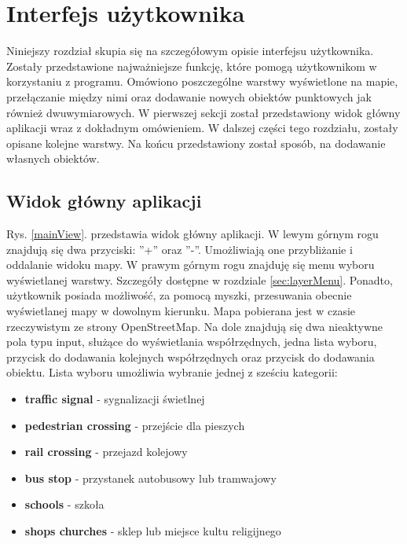 \chapter{Interfejs użytkownika}
\label{cha:UI}
Niniejszy rozdział skupia się na szczegółowym opisie interfejsu użytkownika. Zostały przedstawione najważniejsze funkcję, które pomogą użytkownikom w korzystaniu z programu. Omówiono poszczególne warstwy wyświetlone na mapie, przełączanie między nimi oraz dodawanie nowych obiektów punktowych jak również dwuwymiarowych.
W pierwszej sekcji został przedstawiony widok główny aplikacji wraz z dokładnym omówieniem. W dalszej części tego rozdziału, zostały opisane kolejne warstwy. Na końcu przedstawiony został sposób, na dodawanie własnych obiektów.
\section{Widok główny aplikacji}
\label{sec:mainView}

Rys. \ref{mainView}. przedstawia widok główny aplikacji. W lewym górnym rogu znajdują się dwa przyciski: ''+'' oraz ''-''. Umożliwiają one przybliżanie i oddalanie widoku mapy. W prawym górnym rogu znajduję się menu wyboru wyświetlanej warstwy. Szczegóły dostępne w rozdziale \ref{sec:layerMenu}. Ponadto, użytkownik posiada możliwość, za pomocą myszki, przesuwania obecnie wyświetlanej mapy w dowolnym kierunku. Mapa pobierana jest w czasie rzeczywistym ze strony OpenStreetMap. Na dole znajdują się dwa nieaktywne pola typu input, służące do wyświetlania współrzędnych, jedna lista wyboru, przycisk do dodawania kolejnych współrzędnych oraz przycisk do dodawania obiektu. Lista wyboru umożliwia wybranie jednej z sześciu kategorii:
\begin{itemize}
\item \textbf{traffic signal} - sygnalizacji świetlnej
\item \textbf{pedestrian crossing} - przejście dla pieszych
\item \textbf{rail crossing} - przejazd kolejowy
\item \textbf{bus stop} - przystanek autobusowy lub tramwajowy
\item \textbf{schools} - szkoła
\item \textbf{shops churches} - sklep lub miejsce kultu religijnego
\end{itemize}

